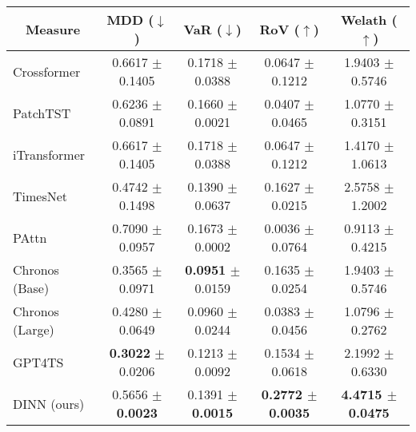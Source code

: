 {\begin{tabular}{lcccc}
\multicolumn{1}{c}{\textbf{Measure}} & \textbf{MDD ($\downarrow$)}                                            & \textbf{VaR ($\downarrow$)}                                   & \textbf{RoV ($\uparrow$)}                         & \textbf{Welath ($\uparrow$)}                      \\ \hline
Crossformer                          & 0.6617 $\pm$ 0.1405                                                    & 0.1718 $\pm$ 0.0388                                           & 0.0647 $\pm$ 0.1212                               & 1.9403 $\pm$ 0.5746                               \\
PatchTST                             & 0.6236 $\pm$ 0.0891                                                    & 0.1660 $\pm$ 0.0021                                           & 0.0407 $\pm$ 0.0465                               & 1.0770 $\pm$ 0.3151                               \\
iTransformer                         & 0.6617 $\pm$ 0.1405                                                    & 0.1718 $\pm$ 0.0388                                           & 0.0647 $\pm$ 0.1212                               & 1.4170 $\pm$ 1.0613                               \\
TimesNet                             & 0.4742 $\pm$ 0.1498                                                    & 0.1390 $\pm$ 0.0637                                           & 0.1627 $\pm$ 0.0215                               & 2.5758 $\pm$ 1.2002                               \\
PAttn                                & 0.7090 $\pm$ 0.0957                                                    & 0.1673 $\pm$ 0.0002                                           & 0.0036 $\pm$ 0.0764                               & 0.9113 $\pm$ 0.4215                               \\
Chronos (Base)                       & 0.3565 $\pm$ 0.0971                                                    & \textbf{0.0951} $\pm$ 0.0159                                  & 0.1635 $\pm$ 0.0254                               & 1.9403 $\pm$ 0.5746                               \\
Chronos (Large)                      & 0.4280 $\pm$ 0.0649                                                    & 0.0960 $\pm$ 0.0244                                           & 0.0383 $\pm$ 0.0456                               & 1.0796 $\pm$ 0.2762                               \\
GPT4TS                               & \textbf{0.3022} $\pm$ 0.0206                                           & 0.1213 $\pm$ 0.0092                                           & 0.1534 $\pm$ 0.0618                               & 2.1992 $\pm$ 0.6330                               \\
DINN (ours)                          & 0.5656 $\pm$ \textbf{\color[HTML]{00009B} 0.0023}                               & 0.1391 $\pm$ \textbf{\color[HTML]{00009B} 0.0015}                      & \textbf{0.2772 $\pm$ \color[HTML]{00009B} 0.0035} & \textbf{4.4715 $\pm$ \color[HTML]{00009B} 0.0475} \\ \hline
\end{tabular}}